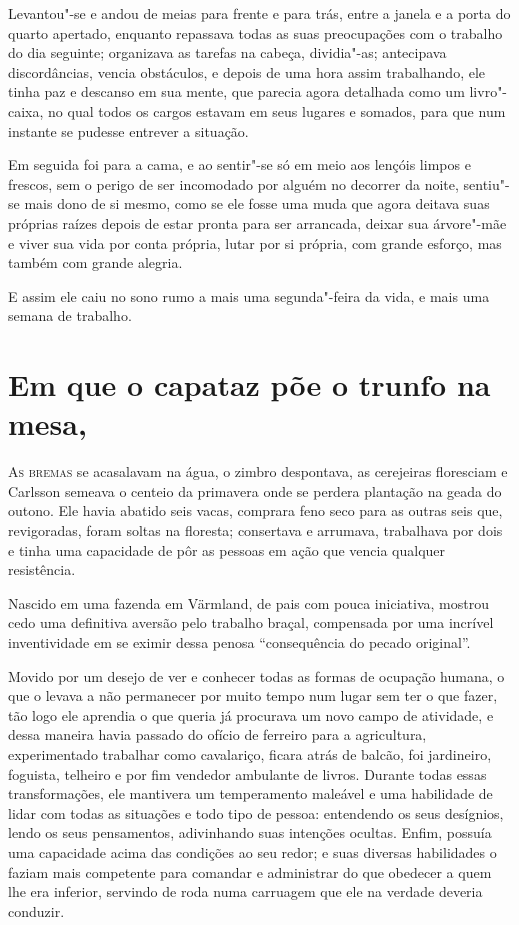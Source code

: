 Levantou"-se e andou de meias para frente e para trás, entre a janela e a
porta do quarto apertado, enquanto repassava todas as suas preocupações com o
trabalho do dia seguinte; organizava as tarefas na cabeça, dividia"-as;
antecipava discordâncias, vencia obstáculos, e depois de uma hora assim
trabalhando, ele tinha paz e descanso em sua mente, que parecia agora detalhada
como um livro"-caixa, no qual todos os cargos estavam em seus lugares e
somados, para que num instante se pudesse entrever a situação.

Em seguida foi para a cama, e ao sentir"-se só em meio aos lençóis limpos e
frescos, sem o perigo de ser incomodado por alguém no decorrer da noite,
sentiu"-se mais dono de si mesmo, como se ele fosse uma muda que agora deitava
suas próprias raízes depois de estar pronta para ser arrancada, deixar sua
árvore"-mãe e viver sua vida por conta própria, lutar por si própria, com grande
esforço, mas também com grande alegria.

E assim ele caiu no sono rumo a mais uma segunda"-feira da vida, e mais
uma semana de trabalho.

\chapter[Em que o capataz põe o trunfo na mesa\ldots]{Em que o capataz põe o trunfo na mesa,
}

\textsc{As bremas} se acasalavam na água, o zimbro despontava, as cerejeiras
floresciam e Carlsson semeava o centeio da primavera onde se perdera plantação
na geada do outono. Ele havia abatido seis vacas, comprara feno seco para as outras seis
que, revigoradas, foram soltas na floresta; consertava e arrumava, trabalhava
por dois e tinha uma capacidade de pôr as pessoas em ação que vencia qualquer
resistência.

Nascido em uma fazenda em Värmland, de pais com pouca iniciativa, mostrou cedo
uma definitiva aversão pelo trabalho braçal, compensada por uma incrível
inventividade em se eximir dessa penosa ``consequência do pecado original''.

Movido por um desejo de ver e conhecer todas as formas de ocupação humana, o que
o levava a não permanecer por muito tempo num lugar sem ter o que fazer, tão
logo ele aprendia o que queria já procurava um novo campo de atividade, e dessa
maneira havia passado do ofício de ferreiro para a agricultura, experimentado
trabalhar como cavalariço, ficara atrás de balcão, foi jardineiro,
foguista, telheiro e por fim vendedor ambulante de livros. Durante todas essas
transformações, ele mantivera um temperamento maleável e uma habilidade de lidar
com todas as situações e todo tipo de pessoa: entendendo os seus desígnios,
lendo os seus pensamentos, adivinhando suas intenções ocultas. Enfim, possuía
uma capacidade acima das condições ao seu redor; e suas diversas habilidades o
faziam mais competente para comandar e administrar do que obedecer a quem lhe
era inferior, servindo de roda numa carruagem que ele na verdade deveria
conduzir.

